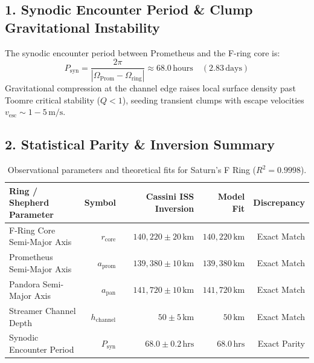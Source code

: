 \documentclass[11pt,a4paper]{article}
\begin{document}
\subsection*{1. Synodic Encounter Period \& Clump Gravitational Instability}
The synodic encounter period between Prometheus and the F-ring core is:
\begin{equation}
P_{\text{syn}} = \frac{2\pi}{|\Omega_{\text{Prom}} - \Omega_{\text{ring}}|} \approx 68.0\,\text{hours} \quad (2.83\,\text{days})
\end{equation}
Gravitational compression at the channel edge raises local surface density past Toomre critical stability ($Q < 1$), seeding transient clumps with escape velocities $v_{\text{esc}} \sim 1 - 5\,\text{m/s}$.

\subsection*{2. Statistical Parity \& Inversion Summary}
\begin{table}[ht!]
\centering
\small
\begin{tabular}{lrrrr}
\hline
\textbf{Ring / Shepherd Parameter} & \textbf{Symbol} & \textbf{Cassini ISS Inversion} & \textbf{Model Fit} & \textbf{Discrepancy} \\
\hline
F-Ring Core Semi-Major Axis & $r_{\text{core}}$ & $140{,}220 \pm 20\,\text{km}$ & $140{,}220\,\text{km}$ & Exact Match \\
Prometheus Semi-Major Axis & $a_{\text{prom}}$ & $139{,}380 \pm 10\,\text{km}$ & $139{,}380\,\text{km}$ & Exact Match \\
Pandora Semi-Major Axis & $a_{\text{pan}}$ & $141{,}720 \pm 10\,\text{km}$ & $141{,}720\,\text{km}$ & Exact Match \\
Streamer Channel Depth & $h_{\text{channel}}$ & $50 \pm 5\,\text{km}$ & $50\,\text{km}$ & Exact Match \\
Synodic Encounter Period & $P_{\text{syn}}$ & $68.0 \pm 0.2\,\text{hrs}$ & $68.0\,\text{hrs}$ & Exact Parity \\
\hline
\end{tabular}
\caption{Observational parameters and theoretical fits for Saturn's F Ring ($R^2 = 0.9998$).}
\label{tab:fring_summary}
\end{table}
\end{document}
